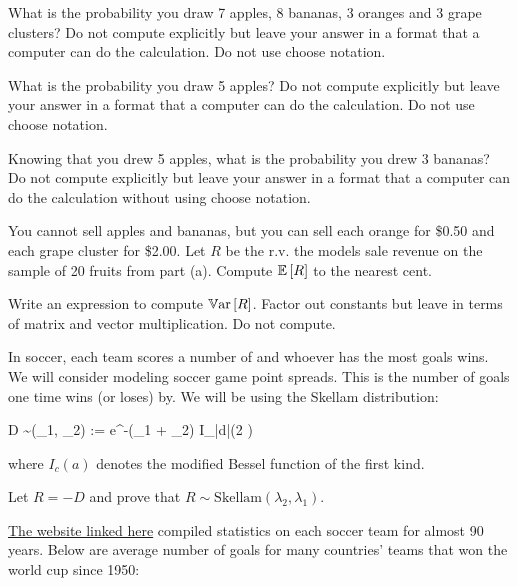 \documentclass[12pt]{article}
\begin{document}
 What is the probability you draw 7 apples, 8 bananas, 3 oranges and 3 grape clusters? Do not compute explicitly but leave your answer in a format that a computer can do the calculation. Do not use choose notation. 

 What is the probability you draw 5 apples? Do not compute explicitly but leave your answer in a format that a computer can do the calculation. Do not use choose notation. 

 Knowing that you drew 5 apples, what is the probability you drew 3 bananas? Do not compute explicitly but leave your answer in a format that a computer can do the calculation without using choose notation. 

 You cannot sell apples and bananas, but you can sell each orange for \$0.50 and each grape cluster for \$2.00. Let $R$ be the r.v. the models sale revenue on the sample of 20 fruits from part (a). Compute $\mathbb{E}\left[R\right]$ to the nearest cent. 

 Write an expression to compute $\mathbb{V}\text{ar}\left[R\right]$. Factor out constants but leave in terms of matrix and vector multiplication. Do not compute. 

\eenum


\problem In soccer, each team scores a number of  and whoever has the most goals wins. We will consider modeling soccer game point spreads. This is the number of goals one time wins (or loses) by. We will be using the Skellam distribution:


\beqn
D \sim {}(\lambda_1, \lambda_2) := e^{-(\lambda_1 + \lambda_2)}  I_{|d|}(2 ) 
\eeqn

\noindent where $I_c(a)$ denotes the modified Bessel function of the first kind. 

\benum

 Let $R = -D$ and prove that $R \sim \text{Skellam}(\lambda_2, \lambda_1)$. 

\href{https://www.statista.com/statistics/269031/goals-scored-per-game-at-the-fifa-world-cup-since-1930/}{The website linked here} compiled statistics on each soccer team for almost 90 years. Below are average number of goals for many countries' teams that won the world cup since 1950:
\end{document}
